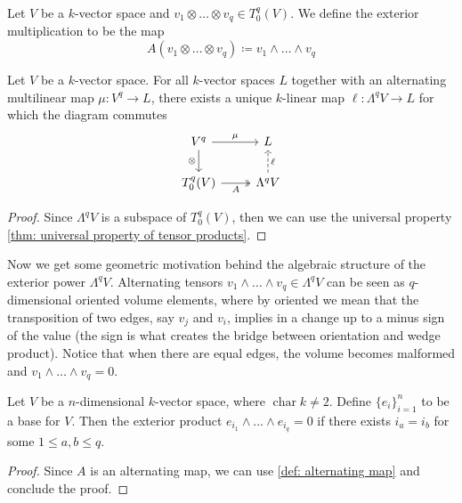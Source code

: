 \begin{definition}
  \label{def: exterior multiplication}
  Let \(V\) be a \(k\)-vector space and \(v_1 \otimes \dots \otimes v_q \in
  T_0^q(V)\). We define the exterior multiplication to be the map
  \[
    A(v_1 \otimes \dots \otimes v_q) \coloneqq v_1 \wedge \dots \wedge v_q
  \]
\end{definition}

\begin{proposition}
  \label{prop: exterior power universal property}
  Let \(V\) be a \(k\)-vector space. For all \(k\)-vector spaces \(L\) together
  with an alternating multilinear map \(\mu: V^q \to L\), there exists a unique
  \(k\)-linear map \(\ell: \Lambda^q V \to L\) for which the diagram commutes
  \[
    \begin{tikzcd}
      V^q \ar[d, swap, "\otimes"] \ar[r, "\mu"]  &L \\
      T_0^q(V) \ar[r, swap, two heads, "A"]
      &\Lambda^q V \ar[u, dashed, swap, "\ell"]
    \end{tikzcd}
  \]
\end{proposition}

\begin{proof}
  Since \(\Lambda^q V\) is a subspace of \(T_0^q(V)\), then we can use the
  universal property \cref{thm: universal property of tensor products}.
\end{proof}

Now we get some geometric motivation behind the algebraic structure of the
exterior power \(\Lambda^q V\). Alternating tensors \(v_1 \wedge \dots \wedge
v_q \in \Lambda^q V\) can be seen as \(q\)-dimensional oriented volume elements,
where by oriented we mean that the transposition of two edges, say \(v_j\) and
\(v_i\), implies in a change up to a minus sign of the value (the sign is what
creates the bridge between orientation and wedge product). Notice that when
there are equal edges, the volume becomes malformed and \(v_1 \wedge \dots
\wedge v_q = 0\).

\begin{proposition}
  Let \(V\) be a \(n\)-dimensional \(k\)-vector space, where
  \(\operatorname{char} k \neq 2\). Define \(\{e_i\}_{i=1}^n\) to be a base for
  \(V\). Then the exterior product \(e_{i_1} \wedge \dots \wedge e_{i_q} = 0\)
  if there exists \(i_a = i_b\) for some \(1 \leq a, b \leq q\).
\end{proposition}

\begin{proof}
  Since \(A\) is an alternating map, we can use \cref{def: alternating map} and
  conclude the proof.
\end{proof}

